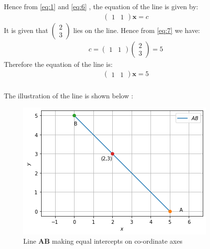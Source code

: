 \documentclass{beamer}
\newcommand{\myvec}[1]{\ensuremath{\begin{pmatrix}#1\end{pmatrix}}}
\renewcommand{\vec}[1]{\mathbf{#1}}
\begin{document}
\begin{frame}{}
Hence from \eqref{eq:1} and \eqref{eq:6} , the equation of the line is given by:
\begin{align}
\myvec{1 & 1}\vec{x}=c\label{eq:7}
\end{align}
It is given that $\myvec{2 \\ 3}$ lies on the line. Hence from \eqref{eq:7} we have:
\begin{align}
c =\myvec{1 & 1}\myvec{2 \\ 3} = 5
\end{align}
Therefore the equation of the line is:
\begin{align}
\myvec{1 & 1}\vec{x}=5
\end{align}
\end{frame}

\begin{frame}
\frametitle{}
The illustration of the line is shown below :
\begin{figure}[!ht]
       \centering
    \includegraphics[width=0.8\columnwidth] {Assignment_4_Fig_1.png}
    \caption{Line $\vec{AB}$ making equal intercepts on co-ordinate axes}
    \label{Line AB}
\end{figure}
\end{frame}
\end{document}
